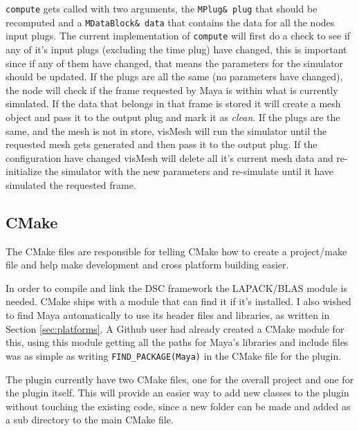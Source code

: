\texttt{compute} gets called with two arguments, the \texttt{MPlug\& plug} that
should be recomputed and a \texttt{MDataBlock\& data} that contains the data for
all the nodes input plugs. The current implementation of \texttt{compute} will
first do a check to see if any of it's input plugs (excluding the time plug)
have changed, this is important since if any of them have changed, that means
the parameters for the simulator should be updated. If the plugs are all the
same (no parameters have changed), the node will check if the frame requested by
Maya is within what is currently simulated. If the data that belongs in that
frame is stored it will create a mesh object and pass it to the output plug and
mark it as \textit{clean}. If the plugs are the same, and the mesh is not in
store, visMesh will run the simulator until the requested mesh gets generated
and then pass it to the output plug. If the configuration have changed visMesh
will delete all it's current mesh data and re-initialize the simulator with the
new parameters and re-simulate until it have simulated the requested frame.

\subsection{CMake}
\label{sec:cmake}

The CMake files are responsible for telling CMake how to create a project/make
file and help make development and cross platform building easier.

In order to compile and link the DSC framework the LAPACK/BLAS module is
needed. CMake ships with a module that can find it if it's installed.
I also wished to find Maya automatically to use its header files and libraries,
as written in Section \ref{sec:platforms}. A Github user had
already created a CMake module for this, using this module getting all the
paths for Maya's libraries and include files was as simple as writing
\texttt{FIND\_PACKAGE(Maya)} in the CMake file for the plugin.

The plugin currently have two CMake files, one for the overall project and one for
the plugin itself. This will provide an easier way to add new classes to the
plugin without touching the existing code, since a new folder can be made and
added as a sub directory to the main CMake file.

